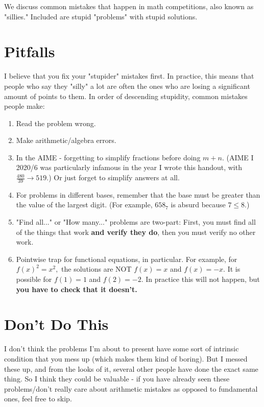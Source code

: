 \documentclass[blue,onecol]{shooting}
\begin{document}
We discuss common mistakes that happen in math competitions, also known as "sillies." Included are stupid "problems" with stupid solutions.

\section{Pitfalls}
I believe that you fix your "stupider" mistakes first. In practice, this means that people who say they "silly" a lot are often the ones who are losing a significant amount of points to them. In order of descending stupidity, common mistakes people make:

\begin{enumerate}
    \item Read the problem wrong.

    \item Make arithmetic/algebra errors.
    
    \item In the AIME - forgetting to simplify fractions before doing $m+n.$ (AIME I 2020/6 was particularly infamous in the year I wrote this handout, with $\frac{480}{39}\to 519.$) Or just forget to simplify answers at all.
    
    \item For problems in different bases, remember that the base must be greater than the value of the largest digit. (For example, $658_7$ is absurd because $7\leq 8.$)
    
    \item "Find all..." or "How many..." problems are two-part: First, you must find all of the things that work \textbf{and verify they do}, then you must verify no other work.
    
    \item Pointwise trap for functional equations, in particular. For example, for $f(x)^2=x^2,$ the solutions are NOT $f(x)=x$ and $f(x)=-x.$ It is possible for $f(1)=1$ and $f(2)=-2.$ In practice this will not happen, but \textbf{you have to check that it doesn't.}
\end{enumerate}

\section{Don't Do This}
I don't think the problems I'm about to present have some sort of intrinsic condition that you mess up (which makes them kind of boring). But I messed these up, and from the looks of it, several other people have done the exact same thing. So I think they could be valuable - if you have already seen these problems/don't really care about arithmetic mistakes as opposed to fundamental ones, feel free to skip.
\end{document}
